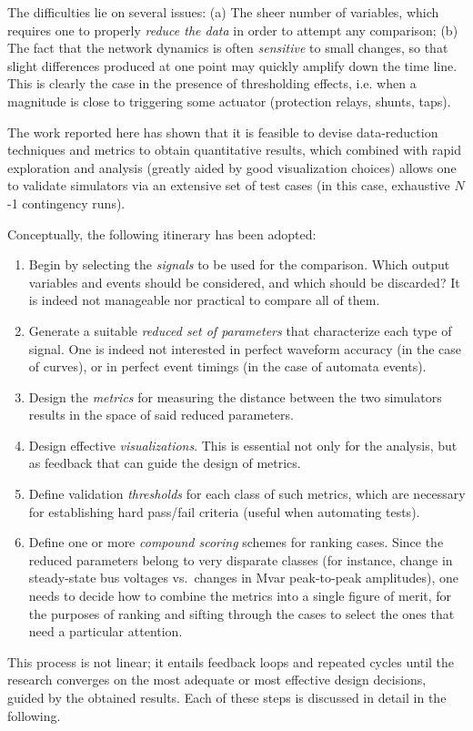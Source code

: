 \documentclass[conference]{IEEEtran}
\begin{document}
The difficulties lie on several issues: (a) The sheer number of variables, which
requires one to properly \emph{reduce the data} in order to attempt any
comparison; (b) The fact that the network dynamics is often \emph{sensitive} to
small changes, so that slight differences produced at one point may quickly
amplify down the time line. This is clearly the case in the presence of
thresholding effects, i.e. when a magnitude is close to triggering some actuator
(protection relays, shunts, taps).

The work reported here has shown that it is feasible to devise
data-reduction techniques and metrics to obtain quantitative results, which
combined with rapid exploration and analysis (greatly aided by good
visualization choices) allows one to validate simulators via an extensive set of
test cases (in this case, exhaustive $N$-1 contingency runs).

Conceptually, the following itinerary has been adopted:
\begin{enumerate}
  \item Begin by selecting the \emph{signals} to be
        used for the comparison. Which output variables and events should
        be considered, and which should be discarded? It is indeed
        not manageable nor practical to compare all of them.
  \item Generate a suitable \emph{reduced set of parameters} that characterize
        each type of signal. One is indeed not interested in perfect waveform
        accuracy (in the case of curves), or in perfect event timings (in the case
        of automata events).
  \item Design the \emph{metrics} for measuring the distance between the two
        simulators results in the space of said reduced parameters.
  \item Design effective \emph{visualizations}. This is essential not only
        for the analysis, but as feedback that can guide the design of
        metrics.
  \item Define validation \emph{thresholds} for each class of such
        metrics, which are necessary for establishing hard pass/fail
        criteria (useful when automating tests).
  \item Define one or more \emph{compound scoring} schemes for ranking
        cases. Since the reduced parameters belong to very disparate classes (for instance, change in steady-state bus voltages vs.\ changes in Mvar
        peak-to-peak amplitudes), one needs to decide how to combine the metrics
        into a single figure of merit, for the purposes of ranking and sifting
        through the cases to select the ones that need a particular attention.
\end{enumerate}
This process is not linear; it entails feedback loops and repeated cycles until
the research converges on the most adequate or most effective design decisions,
guided by the obtained results.  Each of these steps is discussed in detail in the following.
\end{document}
